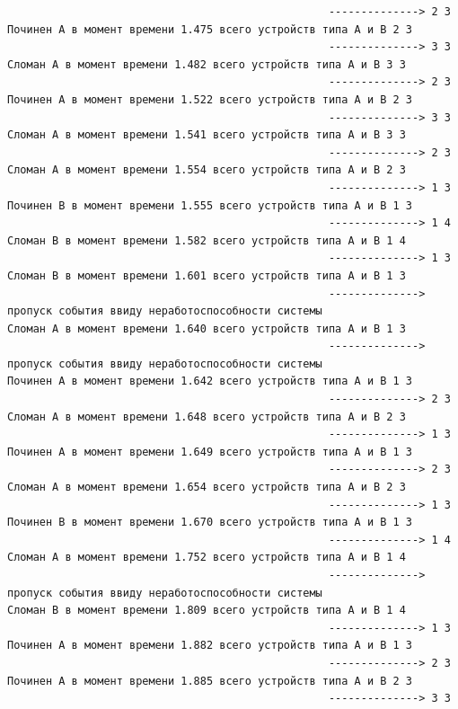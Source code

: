 \begin{verbatim}
                                                  --------------> 2 3
Починен A в момент времени 1.475 всего устройств типа А и В 2 3
                                                  --------------> 3 3
Сломан A в момент времени 1.482 всего устройств типа А и В 3 3
                                                  --------------> 2 3
Починен A в момент времени 1.522 всего устройств типа А и В 2 3
                                                  --------------> 3 3
Сломан A в момент времени 1.541 всего устройств типа А и В 3 3
                                                  --------------> 2 3
Сломан A в момент времени 1.554 всего устройств типа А и В 2 3
                                                  --------------> 1 3
Починен B в момент времени 1.555 всего устройств типа А и В 1 3
                                                  --------------> 1 4
Сломан B в момент времени 1.582 всего устройств типа А и В 1 4
                                                  --------------> 1 3
Сломан B в момент времени 1.601 всего устройств типа А и В 1 3
                                                  --------------> пропуск события ввиду неработоспособности системы
Сломан A в момент времени 1.640 всего устройств типа А и В 1 3
                                                  --------------> пропуск события ввиду неработоспособности системы
Починен A в момент времени 1.642 всего устройств типа А и В 1 3
                                                  --------------> 2 3
Сломан A в момент времени 1.648 всего устройств типа А и В 2 3
                                                  --------------> 1 3
Починен A в момент времени 1.649 всего устройств типа А и В 1 3
                                                  --------------> 2 3
Сломан A в момент времени 1.654 всего устройств типа А и В 2 3
                                                  --------------> 1 3
Починен B в момент времени 1.670 всего устройств типа А и В 1 3
                                                  --------------> 1 4
Сломан A в момент времени 1.752 всего устройств типа А и В 1 4
                                                  --------------> пропуск события ввиду неработоспособности системы
Сломан B в момент времени 1.809 всего устройств типа А и В 1 4
                                                  --------------> 1 3
Починен A в момент времени 1.882 всего устройств типа А и В 1 3
                                                  --------------> 2 3
Починен A в момент времени 1.885 всего устройств типа А и В 2 3
                                                  --------------> 3 3

\end{verbatim}
